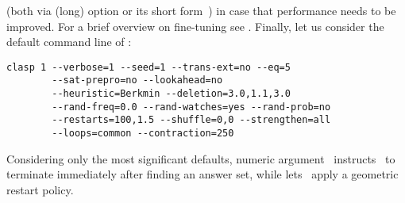 (both via (long) option  or its short form~)
in case that performance needs to be improved.
For a brief overview on fine-tuning see \cite{gekasc09b}.
Finally, let us consider the default command line of \clasp:
%
\begin{lstlisting}[numbers=none]
clasp 1 --verbose=1 --seed=1 --trans-ext=no --eq=5
        --sat-prepro=no --lookahead=no
        --heuristic=Berkmin --deletion=3.0,1.1,3.0
        --rand-freq=0.0 --rand-watches=yes --rand-prob=no 
        --restarts=100,1.5 --shuffle=0,0 --strengthen=all
        --loops=common --contraction=250
\end{lstlisting}
%
Considering only the most significant defaults,
numeric argument~ instructs \clasp\ to terminate immediately
after finding an answer set,
while  lets \clasp\ apply a geometric
restart policy.

